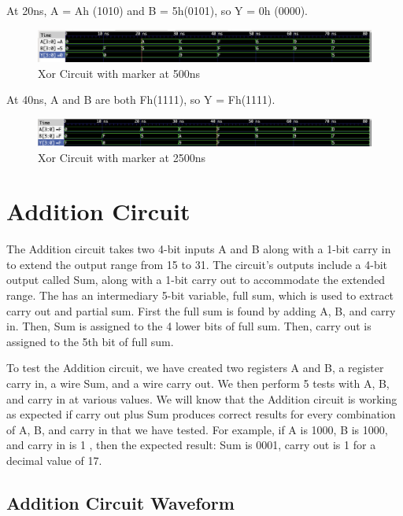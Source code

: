 \documentclass[12pt]{article}
\begin{document}
 At 20ns, A = Ah (1010) and B = 5h(0101), so Y = 0h (0000).
  \begin{figure}[H]
  \centering 
 \includegraphics[width = 1.0\textwidth]{Xnor/XNOR-20ns.png}
  \caption{Xor Circuit with marker at 500ns}
  \label{fig:enter-label}
  \end{figure}
 
 At 40ns, A and B are both Fh(1111), so Y = Fh(1111).
  \begin{figure}[H]
  \centering 
 \includegraphics[width = 1.0\textwidth]{Xnor/XNOR-40ns.png}
  \caption{Xor Circuit with marker at 2500ns}
  \label{fig:enter-label}
  \end{figure}
 

\section{Addition Circuit}
The Addition circuit takes two 4-bit inputs A and B along with a 1-bit carry in to extend the output range from 15 to 31. The circuit’s outputs include  a 4-bit output called Sum, along with a 1-bit carry out to accommodate the extended range. The has an intermediary 5-bit variable, full sum, which is used to extract carry out and partial sum. First the full sum is found by adding A, B, and carry in. Then, Sum is assigned to the 4 lower bits of full sum. Then, carry out is assigned to the 5th bit of full sum. 


To test the Addition circuit, we have created two registers A and B, a register carry in, a wire Sum, and a wire carry out. We then perform 5 tests with A, B, and carry in at various values. We will know that the Addition circuit is working as expected if carry out plus Sum produces correct results for every combination of A, B, and carry in that we have tested. For example, if A is 1000, B is 1000, and carry in is 1 , then the expected result: Sum is 0001, carry out is 1 for a decimal value of 17.

\subsection{Addition Circuit Waveform} 
\end{document}
